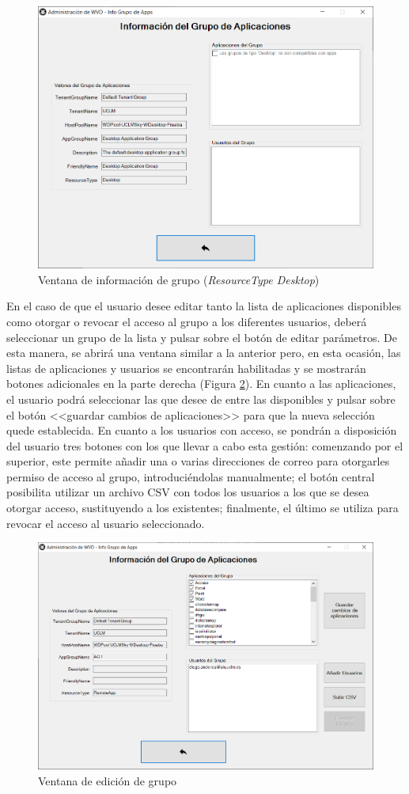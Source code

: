 \begin{figure}[h]
  \centering
  \includegraphics[width=0.7\linewidth]{figures/images/script/ventana_infogrupoDesktop.PNG}
  \caption{Ventana de información de grupo (\textit{ResourceType Desktop})}
  \label{fig:ventana_infogrupoDesktop}
\end{figure}

\clearpage

En el caso de que el usuario desee editar tanto la lista de aplicaciones disponibles como otorgar o revocar el acceso al grupo a los diferentes usuarios, deberá seleccionar un grupo de la lista y pulsar sobre el botón de editar parámetros. De esta manera, se abrirá una ventana similar a la anterior pero, en esta ocasión, las listas de aplicaciones y usuarios se encontrarán habilitadas y se mostrarán botones adicionales en la parte derecha (Figura \ref{fig:ventana_editargrupo}). En cuanto a las aplicaciones, el usuario podrá seleccionar las que desee de entre las disponibles y pulsar sobre el botón <<guardar cambios de aplicaciones>> para que la nueva selección quede establecida. En cuanto a los usuarios con acceso, se pondrán a disposición del usuario tres botones con los que llevar a cabo esta gestión: comenzando por el superior, este permite añadir una o varias direcciones de correo para otorgarles permiso de acceso al grupo, introduciéndolas manualmente; el botón central posibilita utilizar un archivo \acs{CSV} con todos los usuarios a los que se desea otorgar acceso, sustituyendo a los existentes; finalmente, el último se utiliza para revocar el acceso al usuario seleccionado.

\begin{figure}[h]
  \centering
  \includegraphics[width=0.7\linewidth]{figures/images/script/ventana_editargrupo.PNG}
  \caption{Ventana de edición de grupo}
  \label{fig:ventana_editargrupo}
\end{figure}

